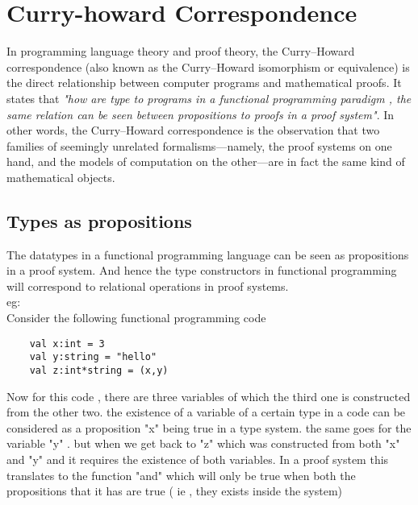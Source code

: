 \chapter{Curry-howard Correspondence}

In programming language theory and proof theory, the Curry–Howard correspondence 
(also known as the Curry–Howard isomorphism or equivalence) is the direct relationship between computer 
programs and mathematical proofs. It states that \textit{"how are type to programs in a functional programming
paradigm , the same relation can be seen between propositions to proofs in a proof system"}.
In other words, the Curry–Howard correspondence is the observation that two families of seemingly unrelated 
formalisms—namely, the proof systems on one hand, and the models of computation on the other—are in 
fact the same kind of mathematical objects. 

\section{Types as propositions}

    The datatypes in a functional programming language can be seen as propositions in a proof system. And hence
the type constructors in functional programming will correspond to relational operations in proof systems.\\
eg:\\
Consider the following functional programming code 
\begin{verbatim}
    val x:int = 3
    val y:string = "hello"
    val z:int*string = (x,y)
\end{verbatim}

Now for this code , there are three variables of which the third one is constructed from the other two.
the existence of a variable of a certain type in a code can be considered as a proposition "x" being true in
a type system. the same goes for the variable "y" . but when we get back to "z" which was constructed from 
both "x" and "y" and it requires the existence of both variables. In a proof system this translates to the function
"and" which will only be true when both the propositions that it has are true ( ie , they exists inside the system)
        
